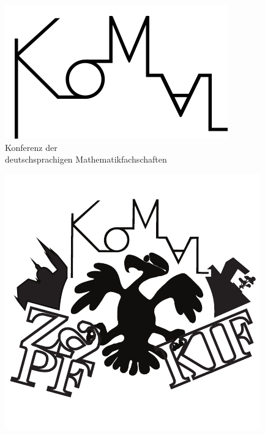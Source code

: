 \documentclass[DIV=calc]{scrartcl}
\begin{document}
\begin{adjustbox}{center}
\begin{minipage}{1.2\textwidth}
	\begin{minipage}{4cm}
		\vspace{-1.4cm}
		\includegraphics[width=\textwidth]{komaLogo.png}\\
		\centering
		\small Konferenz der \\ deutschsprachigen Mathematikfachschaften
	\end{minipage}
	\hfill
	\begin{minipage}[c]{0.25\textwidth}
		\vspace{-2cm}
		\includegraphics[width=\textwidth]{zkk_logo.pdf}

\end{minipage}
\end{minipage}
\end{adjustbox}
\end{document}
